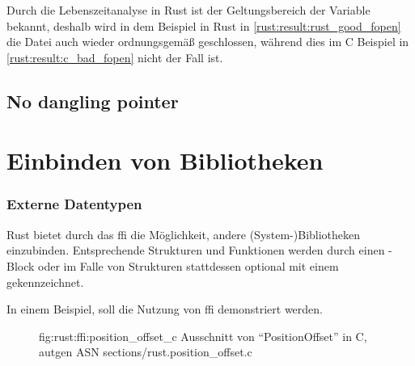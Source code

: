Durch die Lebenszeitanalyse  in Rust ist der Geltungsbereich der  Variable bekannt, deshalb wird in dem Beispiel in Rust in \autoref{rust:result:rust_good_fopen} die Datei auch wieder ordnungsgemäß geschlossen, während dies im C Beispiel in \autoref{rust:result:c_bad_fopen} nicht der Fall ist.


\subsection{No dangling pointer}


\section{Einbinden von Bibliotheken}

\subsubsection{Externe Datentypen}
\label{rust:ffi}
\label{rust:ffi:datatypes}

Rust bietet durch das \gls{ffi} die Möglichkeit, andere (System-)Bibliotheken einzubinden.
Entsprechende Strukturen und Funktionen werden durch einen -Block
oder im Falle von Strukturen stattdessen optional mit einem \rustcinline{#[repr(C)]} gekennzeichnet.

In einem Beispiel, soll die Nutzung von \gls{ffi} demonstriert werden.

\begin{figure}[H]
	\ccinclude
		{fig:rust:ffi:position_offset_c}
		{Ausschnitt von \enquote{PositionOffset}  in C, autgen ASN}
		{sections/rust.position_offset.c}
	
\end{figure}


